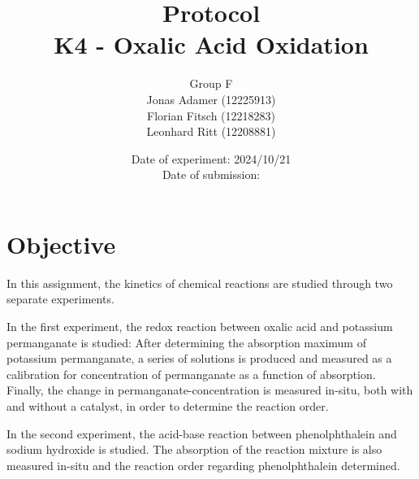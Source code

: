 \documentclass[titlepage]{article}
\title{Protocol \\ K4 - Oxalic Acid Oxidation}
\author{Group F\\Jonas Adamer (12225913)\\Florian Fitsch (12218283)\\Leonhard Ritt (12208881)}
\date{Date of experiment: 2024/10/21\\Date of submission:}
\begin{document}
\maketitle
\thispagestyle{empty}

\newpage
\tableofcontents
\thispagestyle{fancy}


\newpage
\section{Objective}
In this assignment, the kinetics of chemical reactions are studied through two separate experiments.

In the first experiment, the redox reaction between oxalic acid and potassium permanganate is studied: After determining the absorption maximum of potassium permanganate, a series of solutions is produced and measured as a calibration for concentration of permanganate as a function of absorption. Finally, the change in permanganate-concentration is measured in-situ, both with and without a catalyst, in order to determine the reaction order.

In the second experiment, the acid-base reaction between phenolphthalein and sodium hydroxide is studied. The absorption of the reaction mixture is also measured in-situ and the reaction order regarding phenolphthalein determined.




\end{document}
